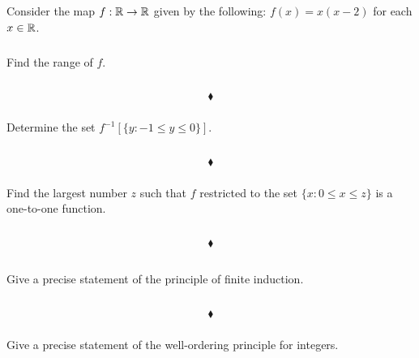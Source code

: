 \renewcommand{\thesubsection}{\thesection.\RomanNumeralCaps{6}}
\subsection{}
Consider the map $f:\mathbb{R}\rightarrow \mathbb{R}$ given by the following: $f(x)=x(x - 2)$ for each $x \in \mathbb{R}$. 
\subsubsection{}
\begin{tcolorbox}
Find the range of $f$.
\end{tcolorbox}
$$ $$

$$\blacklozenge$$

\subsubsection{}
\begin{tcolorbox}
Determine the set $f^{-1}\left[\{y:-1\leq y\leq 0\}\right]$. 
\end{tcolorbox}
$$ $$

$$\blacklozenge$$

\subsubsection{}
\begin{tcolorbox} 
Find the largest number $z$ such that $f$ restricted to the set $\{x :0\leq x \leq z\}$ is a one-to-one function. 
\end{tcolorbox}
$$ $$

$$\blacklozenge$$




\renewcommand{\thesubsection}{\thesection.\RomanNumeralCaps{7}}
\subsection{}
\subsubsection{}
\begin{tcolorbox}
Give a precise statement of the principle of finite induction.  
\end{tcolorbox}
$$ $$

$$\blacklozenge$$

\subsubsection{}
\begin{tcolorbox}
Give a precise statement of the well-ordering principle for integers. 
\end{tcolorbox}
$$ $$

